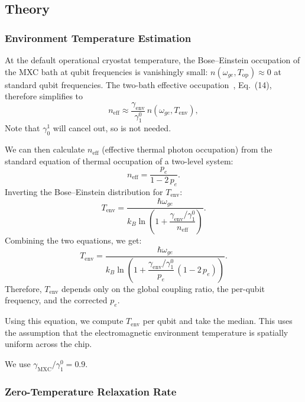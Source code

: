 \documentclass[showpacs,amsmath,amssymb,twocolumn,superscriptaddress,notitlepage,preprintnumbers,pra]{revtex4-1}
\begin{document}
\subsection{Theory}
\subsubsection{Environment Temperature Estimation}
\label{sec:T_env-estimation}

At the default operational cryostat temperature, the Bose--Einstein occupation of the MXC bath at qubit frequencies is vanishingly small: $n(\omega_{ge}, T_\mathrm{op}) \approx 0$ at standard qubit frequencies. The two-bath effective occupation~\cite{lvov2025thermometry}, Eq.~(14), therefore simplifies to
\begin{equation}
	n_\mathrm{eff} \approx \frac{\gamma_\mathrm{env}}{\gamma_1^0}\, n(\omega_{ge}, T_\mathrm{env}),
\end{equation}
Note that $\gamma_0^1$ will cancel out, so is not needed.

We can then calculate $n_\mathrm{eff}$ (effective thermal photon occupation) from the standard equation of thermal occupation of a two-level system:
\begin{equation}
	n_\mathrm{eff} = \frac{p_e}{1 - 2\,p_e}.
\end{equation}
Inverting the Bose--Einstein distribution for $T_\mathrm{env}$:
\begin{equation}
	\label{eq:T_env}
	T_\mathrm{env} = \frac{\hbar\omega_{ge}}{k_B \ln\!\left(1 + \dfrac{\gamma_\mathrm{env}/\gamma_1^0}{n_\mathrm{eff}}\right)}.
\end{equation}
Combining the two equations, we get:
\begin{equation}
	\label{eq:T_env_combined}
	T_\mathrm{env} = \frac{\hbar\omega_{ge}}{k_B \ln\!\left(1 + \dfrac{\gamma_\mathrm{env}/\gamma_1^0}{p_e}\,(1 - 2\,p_e)\right)}.
\end{equation}
Therefore, $T_\mathrm{env}$ depends only on the global coupling ratio, the per-qubit frequency, and the corrected $p_e$.

Using this equation, we compute $T_\mathrm{env}$ per qubit and take the median. This uses the assumption that the electromagnetic environment temperature is spatially uniform across the chip.

We use $\gamma_\mathrm{MXC}/\gamma_1^0 = 0.9$.

\subsubsection{Zero-Temperature Relaxation Rate}
\label{sec:gamma0-derivation}
\end{document}
